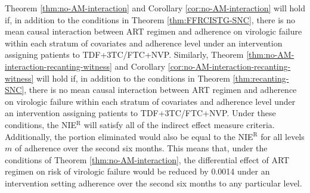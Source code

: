 \documentclass[12pt]{article}
\begin{document}
Theorem \ref{thm:no-AM-interaction} and Corollary \ref{cor:no-AM-interaction} will hold if, in addition to the conditions in Theorem \ref{thm:FFRCISTG-SNC}, there is no mean causal interaction between ART regimen and adherence on virologic failure within each stratum of covariates and adherence level under an intervention assigning patients to TDF+3TC/FTC+NVP. Similarly, Theorem \ref{thm:no-AM-interaction-recanting-witness} and Corollary \ref{cor:no-AM-interaction-recanting-witness} will hold if, in addition to the conditions in Theorem \ref{thm:recanting-SNC}, there is no mean causal interaction between ART regimen and adherence on virologic failure within each stratum of covariates and adherence level under an intervention assigning patients to TDF+3TC/FTC+NVP. Under these conditions, the NIE$^{\text{R}}$ will satisfy all of the indirect effect measure criteria. Additionally, the portion eliminated would also be equal to the NIE$^{\text{R}}$ for all levels $m$ of adherence over the second six months. This means that, under the conditions of Theorem \ref{thm:no-AM-interaction}, the differential effect of ART regimen on risk of virologic failure would be reduced by 0.0014 under an intervention setting adherence over the second six months to any particular level. %
\end{document}
